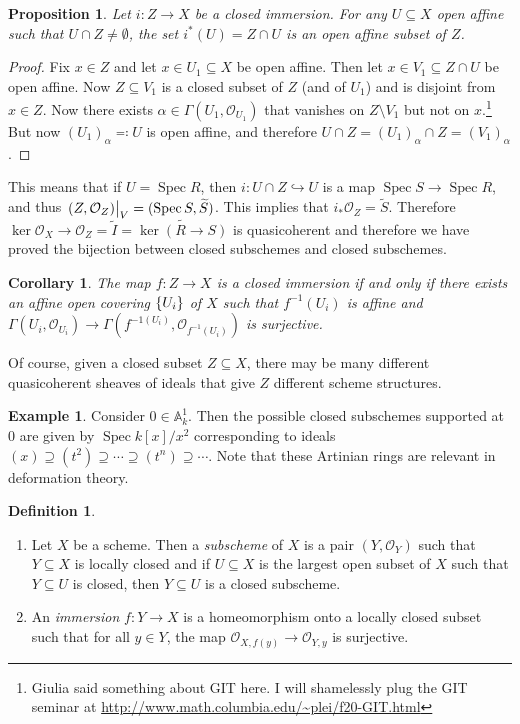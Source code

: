 \documentclass[leqno, openany]{memoir}
\newtheorem{cor}[thm]{Corollary}
\newtheorem{prop}[thm]{Proposition}
\theoremstyle{definition}
\newtheorem{defn}[thm]{Definition}
\newtheorem{exm}[thm]{Example}
\theoremstyle{remark}
\theoremstyle{plain}
\theoremstyle{definition}
\theoremstyle{remark}
\newcommand{\A}{\mathbb{A}}
\newcommand{\mc}[1]{\mathcal{#1}}
\newcommand{\wt}[1]{\widetilde{#1}}
\DeclareMathOperator{\Spec}{Spec}
\begin{document}
\begin{prop} Let $i \colon Z \to X$ be a closed immersion. For any $U \subseteq
X$ open affine such that $U \cap Z \neq \emptyset$, the set $i^* (U) = Z \cap
U$ is an open affine subset of $Z$.  \end{prop}

\begin{proof} Fix $x \in Z$ and let $x \in U_1 \subseteq X$ be open affine.
    Then let $x \in V_1 \subseteq Z \cap U$ be open affine. Now $Z \subseteq
    V_1$ is a closed subset of $Z$ (and of $U_1$) and is disjoint from $x \in
    Z$. Now there exists $\alpha \in \Gamma(U_1, \mc{O}_{U_1})$ that vanishes
    on $Z \setminus V_1$ but not on $x$.\footnote{Giulia said something about
    GIT here. I will shamelessly plug the GIT seminar at
\url{http://www.math.columbia.edu/~plei/f20-GIT.html}} But now
${(U_1)}_{\alpha} \eqqcolon U$ is open affine, and therefore $U \cap Z =
{(U_1)}_{\alpha} \cap Z = {(V_1)}_{\alpha}$.  \end{proof}

This means that if $U = \Spec R$, then $i \colon U \cap Z \hookrightarrow U$ is
a map $\Spec S \to \Spec R$, and thus $\eval{ (Z, \mc{O}_Z) }_V = (\Spec S,
\wt{S})$. This implies that $i_* \mc{O}_Z = \wt{S}$. Therefore $\ker \mc{O}_X
\to \mc{O}_Z = \wt{I} = \wt{\ker (R \to S)}$ is quasicoherent and therefore we
have proved the bijection between closed subschemes and closed subschemes.

\begin{cor} The map $f \colon Z \to X$ is a closed immersion if and only if
    there exists an affine open covering $\qty{U_i}$ of $X$ such that
    $f^{-1}(U_i)$ is affine and $\Gamma(U_i, \mc{O}_{U_i}) \to
    \Gamma(f^{-1(U_i)}, \mc{O}_{f^{-1}(U_i)})$ is surjective.  \end{cor}

Of course, given a closed subset $Z \subseteq X$, there may be many different
quasicoherent sheaves of ideals that give $Z$ different scheme structures.

\begin{exm} Consider $0 \in \A^1_k$. Then the possible closed subschemes
    supported at $0$ are given by $\Spec k[x]/x^2$ corresponding to ideals $(x)
    \supseteq (t^2) \supseteq \cdots \supseteq (t^n) \supseteq \cdots$. Note
    that these Artinian rings are relevant in deformation theory.  \end{exm}

\begin{defn} \begin{enumerate} \item Let $X$ be a scheme. Then a
    \textit{subscheme} of $X$ is a pair $(Y, \mc{O}_Y)$ such that $Y \subseteq
    X$ is locally closed and if $U \subseteq X$ is the largest open subset of
    $X$ such that $Y \subseteq U$ is closed, then $Y \subseteq U$ is a closed
    subscheme.  \item An \textit{immersion} $f \colon Y \to X$ is a
    homeomorphism onto a locally closed subset such that for all $y \in Y$, the
    map $\mc{O}_{X,f(y)} \to \mc{O}_{Y,y}$ is surjective.  \end{enumerate}
\end{defn}
\end{document}
